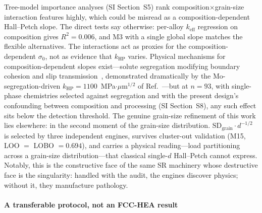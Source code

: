 \documentclass[5p,times,twocolumn]{elsarticle}
\begin{document}
Tree-model importance analyses (SI Section~S5) rank composition$\times$grain-size interaction features highly, which could be misread as a composition-dependent Hall--Petch slope. The direct tests say otherwise: per-alloy $k_\text{eff}$ regression on composition gives $R^2 = 0.006$, and M3 with a single global slope matches the flexible alternatives. The interactions act as proxies for the composition-dependent $\sigma_0$, not as evidence that $k_\text{HP}$ varies. Physical mechanisms for composition-dependent slopes exist---solute segregation modifying boundary cohesion and slip transmission~\cite{Cordero2016,He2014}, demonstrated dramatically by the Mo-segregation-driven $k_\text{HP} = 1100$~MPa$\cdot\mu$m$^{1/2}$ of Ref.~\cite{LiKHP2024}---but at $n = 93$, with single-phase chemistries selected against segregation and with the present design's confounding between composition and processing (SI Section~S8), any such effect sits below the detection threshold. The genuine grain-size refinement of this work lies elsewhere: in the second moment of the grain-size distribution. $\text{SD}_\text{grain}\cdot d^{-1/2}$ is selected by three independent engines, survives cluster-out validation (M15, LOO $=$ LOBO $= 0.694$), and carries a physical reading---load partitioning across a grain-size distribution---that classical single-$d$ Hall--Petch cannot express. Notably, this is the constructive face of the same SR machinery whose destructive face is the singularity: handled with the audit, the engines discover physics; without it, they manufacture pathology.

\paragraph{A transferable protocol, not an FCC-HEA result}
\label{sec:protocol}
\end{document}
